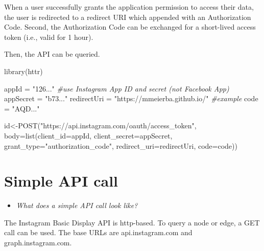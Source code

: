 \documentclass[
]{book}
\newenvironment{Shaded}{\begin{snugshade}}{\end{snugshade}}
\newcommand{\AttributeTok}[1]{\textcolor[rgb]{0.77,0.63,0.00}{#1}}
\newcommand{\CommentTok}[1]{\textcolor[rgb]{0.56,0.35,0.01}{\textit{#1}}}
\newcommand{\FunctionTok}[1]{\textcolor[rgb]{0.00,0.00,0.00}{#1}}
\newcommand{\NormalTok}[1]{#1}
\newcommand{\OtherTok}[1]{\textcolor[rgb]{0.56,0.35,0.01}{#1}}
\newcommand{\StringTok}[1]{\textcolor[rgb]{0.31,0.60,0.02}{#1}}
\providecommand{\tightlist}{%
  \setlength{\itemsep}{0pt}\setlength{\parskip}{0pt}}
\begin{document}
When a user successfully grants the application permission to access their data, the user is redirected to a redirect URI which appended with an Authorization Code. Second, the Authorization Code can be exchanged for a short-lived access token (i.e., valid for 1 hour).

Then, the API can be queried.

\begin{Shaded}
\begin{Highlighting}[]
\FunctionTok{library}\NormalTok{(httr)}

\NormalTok{appId }\OtherTok{=} \StringTok{"126..."} \CommentTok{\#use Instagram App ID and secret (not Facebook App)}
\NormalTok{appSecret }\OtherTok{=} \StringTok{"b73..."} 
\NormalTok{redirectUri }\OtherTok{=} \StringTok{"https://mmeierba.github.io/"} \CommentTok{\#example}
\NormalTok{code }\OtherTok{=} \StringTok{"AQD..."}

\NormalTok{id}\OtherTok{\textless{}{-}}\FunctionTok{POST}\NormalTok{(}\StringTok{"https://api.instagram.com/oauth/access\_token"}\NormalTok{, }
     \AttributeTok{body=}\FunctionTok{list}\NormalTok{(}\AttributeTok{client\_id=}\NormalTok{appId, }\AttributeTok{client\_secret=}\NormalTok{appSecret, }\AttributeTok{grant\_type=}\StringTok{"authorization\_code"}\NormalTok{, }\AttributeTok{redirect\_uri=}\NormalTok{redirectUri, }\AttributeTok{code=}\NormalTok{code))}
\end{Highlighting}
\end{Shaded}

\hypertarget{simple-api-call-6}{%
\section{Simple API call}\label{simple-api-call-6}}

\begin{itemize}
\tightlist
\item
  \emph{What does a simple API call look like?}
\end{itemize}

The Instagram Basic Display API is http-based. To query a node or edge, a GET call can be used. The base URLs are api.instagram.com and graph.instagram.com.
\end{document}
